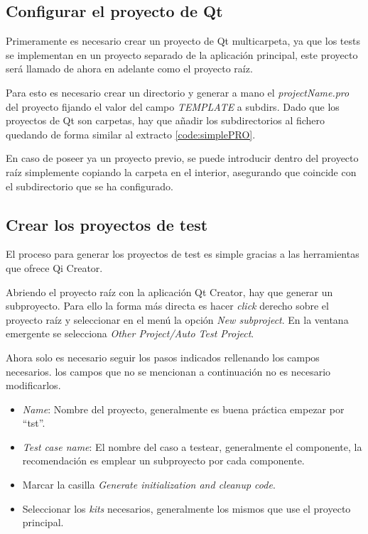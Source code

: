 \subsection{Configurar el proyecto de Qt}

Primeramente es necesario crear un proyecto de Qt multicarpeta, ya que los tests se implementan en un proyecto separado de la aplicación principal, este proyecto será llamado de ahora en adelante como el proyecto raíz.

Para esto es necesario crear un directorio y generar a mano el \textit{projectName.pro} del proyecto fijando el valor del campo \textit{TEMPLATE} a subdirs. Dado que los proyectos de Qt son carpetas, hay que añadir los subdirectorios al fichero quedando de forma similar al extracto \ref{code:simplePRO}.


En caso de poseer ya un proyecto previo, se puede introducir dentro del proyecto raíz simplemente copiando la carpeta en el interior, asegurando que coincide con el subdirectorio que se ha configurado.

\subsection{Crear los proyectos de test}

El proceso para generar los proyectos de test es simple gracias a las herramientas que ofrece Qi Creator.

Abriendo el proyecto raíz con la aplicación Qt Creator, hay que generar un subproyecto. Para ello la forma más directa es hacer \textit{click} derecho sobre el proyecto raíz y seleccionar en el menú la opción \textit{New subproject}. En la ventana emergente se selecciona \textit{Other Project/Auto Test Project}.

Ahora solo es necesario seguir los pasos indicados rellenando los campos necesarios. los campos que no se mencionan a continuación no es necesario modificarlos.

\begin{itemize}
    \item \textit{Name}: Nombre del proyecto, generalmente es buena práctica empezar por ``tst''.
    \item \textit{Test case name}: El nombre del caso a testear, generalmente el componente, la recomendación es emplear un subproyecto por cada componente.
    \item Marcar la casilla \textit{Generate initialization and cleanup code}.
    \item Seleccionar los \textit{kits} necesarios, generalmente los mismos que use el proyecto principal.
\end{itemize}

